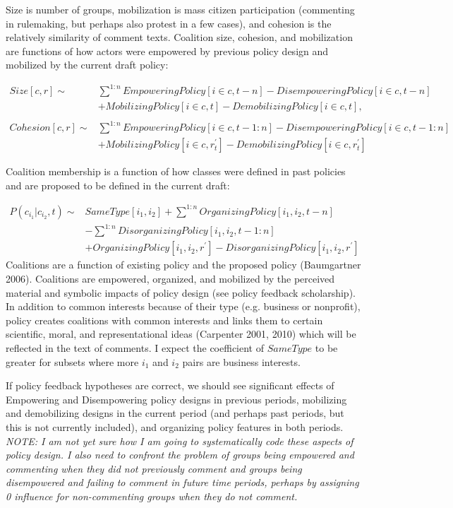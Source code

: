 Size is number of groups, mobilization is mass citizen participation (commenting in rulemaking, but perhaps also protest in a few cases), and cohesion is the relatively similarity of comment texts. Coalition size, cohesion, and mobilization are functions of how actors were empowered by previous policy design and mobilized by the current draft policy:

\begin{align}
Size[c,r] \sim &
\sum^{1:n} EmpoweringPolicy[i\in c, t-n] -  DisempoweringPolicy[i\in c, t-n] \\&+ MobilizingPolicy[i\in c, t] - DemobilizingPolicy[i\in c, t],
\\
\\
Cohesion[c,r] \sim &
\sum^{1:n} EmpoweringPolicy[i\in c, t-1:n] - DisempoweringPolicy[i\in c, t-1:n] \\&+ MobilizingPolicy[i\in c, r_t^{\prime}] - DemobilizingPolicy[i\in c, r_t^{\prime}]
\end{align}

Coalition membership is a function of how classes were defined in past policies and are proposed to be defined in the current draft:

\begin{align}
P(c_{i_1} | c_{i_2}, t) \sim &SameType[i_1, i_2] + \sum^{1:n}OrganizingPolicy[i_1,i_2, t-n] \\&- \sum^{1:n}DisorganizingPolicy[i_1, i_2, t-1:n] \\&+ OrganizingPolicy[i_1,i_2, r^{\prime}] - DisorganizingPolicy[i_1, i_2, r^{\prime}]
\end{align} 
Coalitions are a function of existing policy and the proposed policy (Baumgartner 2006). Coalitions are empowered, organized, and mobilized by the perceived material and symbolic impacts of policy design (see policy feedback scholarship). In addition to common interests because of their type (e.g. business or nonprofit), policy creates coalitions with common interests and links them to certain scientific, moral, and representational ideas (Carpenter 2001, 2010) which will be reflected in the text of comments. I expect the coefficient of $Same Type$ to be greater for subsets where more $i_1$ and $i_2$ pairs are business interests. 

If policy feedback hypotheses are correct, we should see significant effects of Empowering and Disempowering policy designs in previous periods, mobilizing and demobilizing designs in the current period (and perhaps past periods, but this is not currently included), and organizing policy features in both periods. \textit{NOTE: I am not yet sure how I am going to systematically code these aspects of policy design. I also need to confront the problem of groups being empowered and commenting when they did not previously comment and groups being disempowered and failing to comment in future time periods, perhaps by assigning 0 influence for non-commenting groups when they do not comment.}

